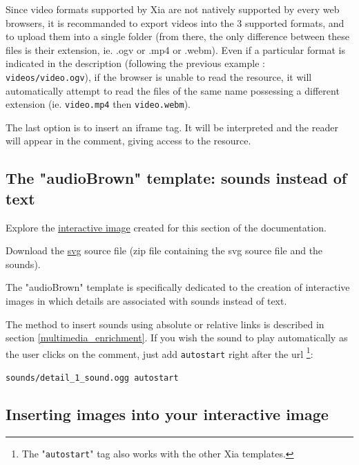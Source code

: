 \begin{tip}
Since video formats supported by Xia are not natively supported by every web 
browsers, it is recommanded to export videos into the 3 supported formats, 
and to upload them into a single folder (from there, the only difference 
between these files is their extension, ie. .ogv or .mp4 or .webm).
Even if a particular format is indicated in the description (following 
the previous example : \verb|videos/video.ogv|), if the browser is 
unable to read the resource, it will automatically attempt to read the files 
of the same name possessing a different extension (ie. \verb|video.mp4| 
then \verb|video.webm|).
\end{tip}

The last option is to insert an iframe tag.
It will be interpreted and the reader will appear in the comment, 
giving access to the resource.

\subsection{The "audioBrown" template: sounds instead of text}\label{audioBrownsection}

\begin{links}
Explore the \href{http://xia.dane.ac-versailles.fr/demo/tuto/xia4}{interactive image} created for this section of the documentation.

Download the \href{http://xia.dane.ac-versailles.fr/demo/tuto/xia4/svg/xia4.zip}{svg} source file (zip file containing the svg source file
and the sounds).
\end{links}

The "audioBrown" template is specifically dedicated to the creation of 
interactive images in which details are associated with sounds instead of text.

The method to insert sounds using absolute or relative links is described in 
section 
\ref{multimedia_enrichment}. If you wish the sound to play 
automatically as the user clicks on the comment, just add \verb|autostart| right 
after the url \footnote{The "\texttt{autostart}" tag also works with the other 
Xia templates.}:\\
\begin{center}
 \verb|sounds/detail_1_sound.ogg autostart|
\end{center}


\subsection{Inserting images into your interactive image}\label{insertion_images}

